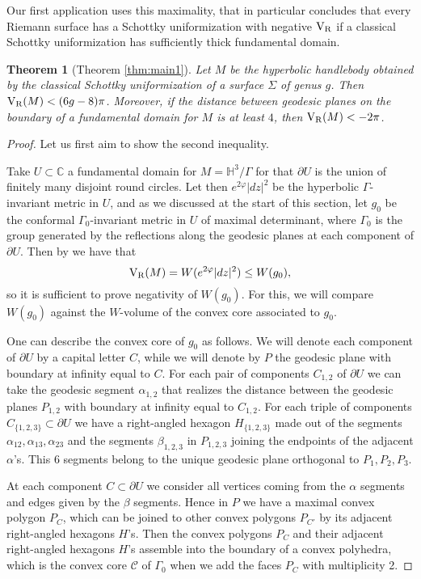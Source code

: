 \documentclass[12pt]{amsart}
\newcommand{\VR}{{\rm V}_{\rm R}}
\newtheorem{theorem}{Theorem}[section]
\begin{document}
Our first application uses this maximality, that in particular concludes that every Riemann surface has a Schottky uniformization with negative $\VR$ if a classical Schottky uniformization has sufficiently thick fundamental domain.

\begin{theorem}[Theorem \ref{thm:main1}]
Let $M$ be the hyperbolic handlebody obtained by the classical Schottky uniformization of a surface $\Sigma$ of genus $g$. Then $\VR(M) < (6g-8)\pi$. Moreover, if the distance between geodesic planes on the boundary of a fundamental domain for $M$ is at least $4$, then $\VR(M)<-2\pi$.
\end{theorem}
\begin{proof}
Let us first aim to show the second inequality.

Take $U\subset \mathbb{C}$ a fundamental domain for $M= \mathbb{H}^3/\Gamma$ for that $\partial U$ is the union of finitely many disjoint round circles. Let then $e^{2\varphi}|dz|^2$ be the hyperbolic $\Gamma$-invariant metric in $U$, and as we discussed at the start of this section, let $g_0$ be the conformal $\Gamma_0$-invariant metric in $U$ of maximal determinant, where $\Gamma_0$ is the group generated by the reflections along the geodesic planes at each component of $\partial U$. Then by \cite[Theorem 1]{OsgoodPhillipsSarnak} we have that
\begin{equation}
    \VR(M)=W(e^{2\varphi}|dz|^2) \leq W(g_0),
\end{equation}
so it is sufficient to prove negativity of $W(g_0)$. For this, we will compare $W(g_0)$ against the $W$-volume of the convex core associated to $g_0$.

One can describe the convex core of $g_0$ as follows. We will denote each component of $\partial U$ by a capital letter $C$, while we will denote by $P$ the geodesic plane with boundary at infinity equal to $C$. For each pair of components $C_{1,2}$ of $\partial U$ we can take the geodesic segment $\alpha_{1,2}$ that realizes the distance between the geodesic planes $P_{1,2}$ with boundary at infinity equal to $C_{1,2}$. For each triple of components $C_{\lbrace 1,2,3\rbrace}\subset \partial U$ we have a right-angled hexagon $H_{\lbrace 1,2,3\rbrace}$ made out of the segments $\alpha_{12},\alpha_{13},\alpha_{23}$ and the segments $\beta_{1,2,3}$ in $P_{1,2,3}$ joining the endpoints of the adjacent $\alpha$'s. This 6 segments belong to the unique geodesic plane orthogonal to $P_1, P_2, P_3$.

At each component $C\subset \partial U$ we consider all vertices coming from the $\alpha$ segments and edges given by the $\beta$ segments. Hence in $P$ we have a maximal convex polygon $P_C$, which can be joined to other convex polygons $P_{C'}$ by its adjacent right-angled hexagons $H$'s. Then the convex polygons $P_C$ and their adjacent right-angled hexagons $H$'s assemble into the boundary of a convex polyhedra, which is the convex core $\mathcal{C}$ of $\Gamma_0$ when we add the faces $P_C$ with multiplicity 2.


\end{proof}
\end{document}
